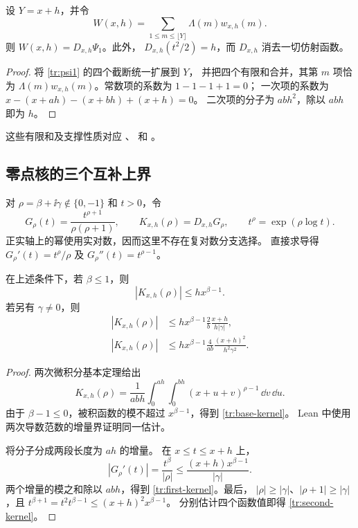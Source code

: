 \begin{lemma}[有限和与四点差分]\label{tr:finite-identity}
设 $Y=x+h$，并令
\[
 W(x,h)=\sum_{1\leq m\leq\lfloor Y\rfloor}\Lambda(m)w_{x,h}(m).
\]
则 $W(x,h)=D_{x,h}\Psi_1$。此外，
$D_{x,h}(t^2/2)=h$，而 $D_{x,h}$ 消去一切仿射函数。
\end{lemma}
\begin{proof}
将 \eqref{tr:psi1} 的四个截断统一扩展到 $Y$，
并把四个有限和合并，其第 $m$ 项恰为
$\Lambda(m)w_{x,h}(m)$。常数项的系数为 $1-1-1+1=0$；
一次项的系数为 $x-(x+ah)-(x+bh)+(x+h)=0$。
二次项的分子为 $abh^2$，除以 $abh$ 即为 $h$。
\end{proof}

这些有限和及支撑性质对应
、
和 。

\subsection{零点核的三个互补上界}

对 $\rho=\beta+\ii\gamma\notin\{0,-1\}$ 和 $t>0$，令
\[
 G_\rho(t)=\frac{t^{\rho+1}}{\rho(\rho+1)},\qquad
 K_{x,h}(\rho)=D_{x,h}G_\rho,\qquad
 t^\rho=\exp(\rho\log t).
\]
正实轴上的幂使用实对数，因而这里不存在复对数分支选择。
直接求导得 $G_\rho'(t)=t^\rho/\rho$ 及
$G_\rho''(t)=t^{\rho-1}$。

\begin{lemma}\label{tr:three-kernels}
在上述条件下，若 $\beta\leq1$，则
\begin{equation}\label{tr:base-kernel}
 |K_{x,h}(\rho)|\leq h x^{\beta-1}.
\end{equation}
若另有 $\gamma\ne0$，则
\begin{align}
 |K_{x,h}(\rho)|
 &\leq h x^{\beta-1}\frac{2}{b}
                  \frac{x+h}{h|\gamma|},\label{tr:first-kernel}\\
 |K_{x,h}(\rho)|
 &\leq h x^{\beta-1}\frac{4}{ab}
                  \frac{(x+h)^2}{h^2\gamma^2}. \label{tr:second-kernel}
\end{align}
\end{lemma}
\begin{proof}
两次微积分基本定理给出
\[
 K_{x,h}(\rho)=
 \frac1{abh}\int_0^{ah}\int_0^{bh}
       (x+u+v)^{\rho-1}\,\dd v\,\dd u.
\]
由于 $\beta-1\leq0$，被积函数的模不超过
$x^{\beta-1}$，得到 \eqref{tr:base-kernel}。
Lean 中使用两次导数范数的增量界证明同一估计。

将分子分成两段长度为 $ah$ 的增量。
在 $x\leq t\leq x+h$ 上，
\[
 |G_\rho'(t)|
 =\frac{t^\beta}{|\rho|}
 \leq \frac{(x+h)x^{\beta-1}}{|\gamma|}.
\]
两个增量的模之和除以 $abh$，得到
\eqref{tr:first-kernel}。最后，
$|\rho|\geq|\gamma|$、$|\rho+1|\geq|\gamma|$，且
$t^{\beta+1}=t^2t^{\beta-1}\leq(x+h)^2x^{\beta-1}$。
分别估计四个函数值即得 \eqref{tr:second-kernel}。
\end{proof}

